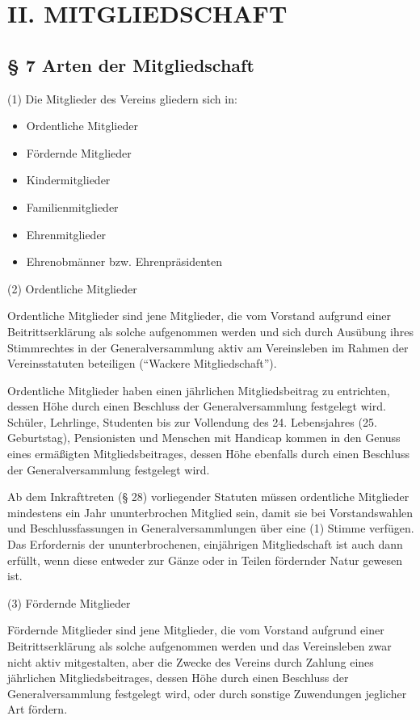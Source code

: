 \documentclass[11pt,a4paper]{article}
\begin{document}
\section{II. MITGLIEDSCHAFT}

\subsection{§ 7
Arten der Mitgliedschaft}

(1)
Die Mitglieder des Vereins gliedern sich in:

\begin{itemize}
\item
Ordentliche Mitglieder
\item
Fördernde Mitglieder
\item
Kindermitglieder
\item
Familienmitglieder
\item
Ehrenmitglieder
\item
Ehrenobmänner bzw. Ehrenpräsidenten
\end{itemize}

(2)
Ordentliche Mitglieder

Ordentliche Mitglieder sind jene Mitglieder, die vom Vorstand aufgrund einer Beitrittserklärung als solche aufgenommen werden und sich durch Ausübung ihres Stimmrechtes in der Generalversammlung aktiv am Vereinsleben im Rahmen der Vereinsstatuten beteiligen ("`Wackere Mitgliedschaft"').

Ordentliche Mitglieder haben einen jährlichen Mitgliedsbeitrag zu entrichten, dessen Höhe durch einen Beschluss der Generalversammlung festgelegt wird.
Schüler, Lehrlinge, Studenten bis zur Vollendung des 24. Lebensjahres (25. Geburtstag), Pensionisten und Menschen mit Handicap kommen in den Genuss eines ermäßigten Mitgliedsbeitrages, dessen Höhe ebenfalls durch einen Beschluss der Generalversammlung festgelegt wird.

Ab dem Inkrafttreten (§ 28) vorliegender Statuten müssen ordentliche Mitglieder mindestens ein Jahr ununterbrochen Mitglied sein, damit sie bei Vorstandswahlen und Beschlussfassungen in Generalversammlungen über eine (1) Stimme verfügen.
Das Erfordernis der ununterbrochenen, einjährigen Mitgliedschaft ist auch dann erfüllt, wenn diese entweder zur Gänze oder in Teilen fördernder Natur gewesen ist.

(3)
Fördernde Mitglieder

Fördernde Mitglieder sind jene Mitglieder, die vom Vorstand aufgrund einer Beitrittserklärung als solche aufgenommen werden und das Vereinsleben zwar nicht aktiv mitgestalten, aber die Zwecke des Vereins durch Zahlung eines jährlichen Mitgliedsbeitrages, dessen Höhe durch einen Beschluss der Generalversammlung festgelegt wird, oder durch sonstige Zuwendungen jeglicher Art fördern.
\end{document}
